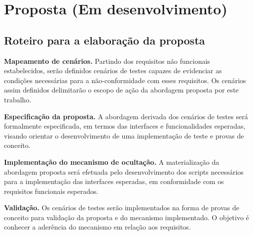 \chapter{Proposta (Em desenvolvimento)}

\section{Roteiro para a elaboração da proposta}

\begin{alineas}
	\item \textbf{Mapeamento de cenários.} Partindo dos requisitos não funcionais estabelecidos, serão definidos cenários de testes capazes de evidenciar as condições necessárias para a não-conformidade com esses requisitos. Os cenários assim definidos delimitarão o escopo de ação da abordagem proposta por este trabalho.
	\item \textbf{Especificação da proposta.} A abordagem derivada dos cenários de testes será formalmente especificada, em termos das interfaces e funcionalidades esperadas, visando orientar o desenvolvimento de uma implementação de teste e provas de conceito.
	\item \textbf{Implementação do mecanismo de ocultação.} A materialização da abordagem proposta será efetuada pelo desenvolvimento dos scripts necessários para a implementação das interfaces esperadas, em conformidade com os requisitos funcionais esperados.
	\item \textbf{Validação.} Os cenários de testes serão implementados na forma de provas de conceito para validação da proposta e do mecanismo implementado. O objetivo é conhecer a aderência do mecanismo em relação aos requisitos.
\end{alineas}